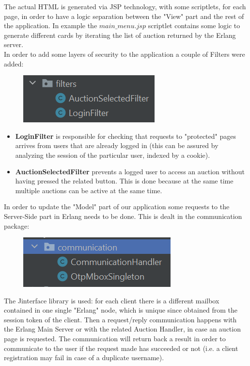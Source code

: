 The actual HTML is generated via JSP technology, with some scriptlets, for each page, in order to have a logic separation between the "View" part and the rest of the application. In example the $main\_menu.jsp$ scriptlet contains some logic to generate different cards by iterating the list of auction returned by the Erlang server.\\

\noindent In order to add some layers of security to the application a couple of Filters were added:\\
\begin{figure}[H]
	\centering
	\includegraphics[width=0.4\linewidth]{img/filters}
	\caption{}
	\label{fig:filters}
\end{figure}
\begin{itemize}
	\item \textbf{LoginFilter} is responsible for checking that requests to "protected" pages arrives from users that are already logged in (this can be assured by analyzing the session of the particular user, indexed by a cookie).
		
	\item \textbf{AuctionSelectedFilter} prevents a logged user to access an auction without having pressed the related button. This is done because at the same time multiple auctions can be active at the same time.\\
	
\end{itemize}
In order to update the "Model" part of our application some requests to the Server-Side part in Erlang needs to be done. This is dealt in the communication package:

\begin{figure}[H]
	\centering
	\includegraphics[width=0.4\linewidth]{img/communication}
	\caption{}
	\label{fig:communication}
\end{figure}

\noindent The Jinterface library is used: for each client there is a different mailbox contained in one single "Erlang" node, which is unique since obtained from the session token of the client. Then a request/reply communication happens with the Erlang Main Server or with the related Auction Handler, in case an auction page is requested. The communication will return back a result in order to communicate to the user if the request made has succeeded or not (i.e. a client registration may fail in case of a duplicate username).
